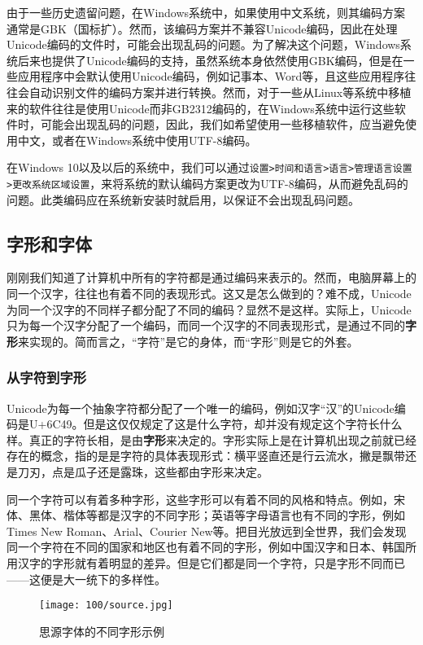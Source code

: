 由于一些历史遗留问题，在Windows系统中，如果使用中文系统，则其编码方案通常是GBK（国标扩）。然而，该编码方案并不兼容Unicode编码，因此在处理Unicode编码的文件时，可能会出现乱码的问题。为了解决这个问题，Windows系统后来也提供了Unicode编码的支持，虽然系统本身依然使用GBK编码，但是在一些应用程序中会默认使用Unicode编码，例如记事本、Word等，且这些应用程序往往会自动识别文件的编码方案并进行转换。然而，对于一些从Linux等系统中移植来的软件往往是使用Unicode而非GB2312编码的，在Windows系统中运行这些软件时，可能会出现乱码的问题，因此，我们如希望使用一些移植软件，应当避免使用中文，或者在Windows系统中使用UTF-8编码。

在Windows 10以及以后的系统中，我们可以通过\texttt{设置>时间和语言>语言>管理语言设置>更改系统区域设置}，来将系统的默认编码方案更改为UTF-8编码，从而避免乱码的问题。此类编码应在系统新安装时就启用，以保证不会出现乱码问题。

\subsection{字形和字体}

刚刚我们知道了计算机中所有的字符都是通过编码来表示的。然而，电脑屏幕上的同一个汉字，往往也有着不同的表现形式。这又是怎么做到的？难不成，Unicode为同一个汉字的不同样子都分配了不同的编码？显然不是这样。实际上，Unicode只为每一个汉字分配了一个编码，而同一个汉字的不同表现形式，是通过不同的\textbf{字形}来实现的。简而言之，“字符”是它的身体，而“字形”则是它的外套。

\subsubsection{从字符到字形}

Unicode为每一个抽象字符都分配了一个唯一的编码，例如汉字“汉”的Unicode编码是U+6C49。但是这仅仅规定了这是什么字符，却并没有规定这个字符长什么样。真正的字符长相，是由\textbf{字形}来决定的。字形实际上是在计算机出现之前就已经存在的概念，指的是是字符的具体表现形式：横平竖直还是行云流水，撇是飘带还是刀刃，点是瓜子还是露珠，这些都由字形来决定。

同一个字符可以有着多种字形，这些字形可以有着不同的风格和特点。例如，宋体、黑体、楷体等都是汉字的不同字形；英语等字母语言也有不同的字形，例如Times New Roman、Arial、Courier New等。把目光放远到全世界，我们会发现同一个字符在不同的国家和地区也有着不同的字形，例如中国汉字和日本、韩国所用汉字的字形就有着明显的差异。但是它们都是同一个字符，只是字形不同而已——这便是大一统下的多样性。

\begin{figure}[htbp]
  \centering
  \texttt{[image: 100/source.jpg]}
  \caption{思源字体的不同字形示例}
\end{figure}


